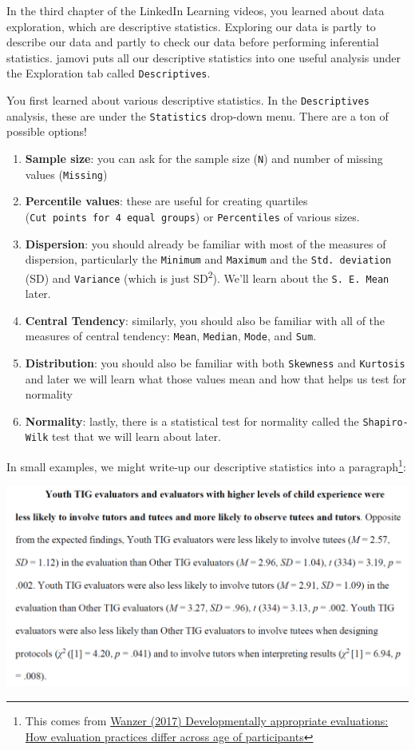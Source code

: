 \documentclass[
]{book}
\providecommand{\tightlist}{%
  \setlength{\itemsep}{0pt}\setlength{\parskip}{0pt}}
\begin{document}
In the third chapter of the LinkedIn Learning videos, you learned about data exploration, which are descriptive statistics. Exploring our data is partly to describe our data and partly to check our data before performing inferential statistics. jamovi puts all our descriptive statistics into one useful analysis under the Exploration tab called \texttt{Descriptives}.

You first learned about various descriptive statistics. In the \texttt{Descriptives} analysis, these are under the \texttt{Statistics} drop-down menu. There are a ton of possible options!

\begin{enumerate}
\def\labelenumi{\arabic{enumi}.}
\tightlist
\item
  \textbf{Sample size}: you can ask for the sample size (\texttt{N}) and number of missing values (\texttt{Missing})
\item
  \textbf{Percentile values}: these are useful for creating quartiles (\texttt{Cut\ points\ for\ 4\ equal\ groups}) or \texttt{Percentiles} of various sizes.
\item
  \textbf{Dispersion}: you should already be familiar with most of the measures of dispersion, particularly the \texttt{Minimum} and \texttt{Maximum} and the \texttt{Std.\ deviation} (SD) and \texttt{Variance} (which is just SD\textsuperscript{2}). We'll learn about the \texttt{S.\ E.\ Mean} later.
\item
  \textbf{Central Tendency}: similarly, you should also be familiar with all of the measures of central tendency: \texttt{Mean}, \texttt{Median}, \texttt{Mode}, and \texttt{Sum}.
\item
  \textbf{Distribution}: you should also be familiar with both \texttt{Skewness} and \texttt{Kurtosis} and later we will learn what those values mean and how that helps us test for normality
\item
  \textbf{Normality}: lastly, there is a statistical test for normality called the \texttt{Shapiro-Wilk} test that we will learn about later.
\end{enumerate}

In small examples, we might write-up our descriptive statistics into a paragraph\footnote{This comes from \href{https://thesiscommons.org/bk57d/}{Wanzer (2017) Developmentally appropriate evaluations: How evaluation practices differ across age of participants}}:

\includegraphics[width=6.27083in,height=\textheight]{images/02-stats-foundations/example1.png}
\end{document}
